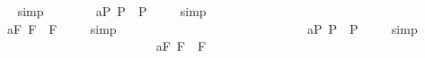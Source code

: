 \begin{isabellebody}
\isadelimproof
\ %
\endisadelimproof
%
\isatagproof
{}\isamarkupfalse%
\ simp\ \isamarkupfalse%
%
\endisatagproof
{\isafoldproof}%
%
\isadelimproof
%
\endisadelimproof
\ \ \ \ \ \isanewline
{}\isamarkupfalse%
\ a{}{}{\isacharunderscore}{}{\isacharunderscore}P{\isacharcolon}\ {\isachardoublequoteopen}{\isacharbrackleft}\isactrlbold {\isasymbox}{\isacharparenleft}{\isasymphi}\isactrlsup P{\isacharparenright}\ \isactrlbold {\isasymrightarrow}\ {\isacharparenleft}{\isasymphi}\isactrlsup P{\isacharparenright}{\isacharbrackright}\ {\isacharequal}\ {\isasymtop}{\isachardoublequoteclose}%
\isadelimproof
\ %
\endisadelimproof
%
\isatagproof
{}\isamarkupfalse%
\ simp\ \isamarkupfalse%
%
\endisatagproof
{\isafoldproof}%
%
\isadelimproof
%
\endisadelimproof
\ \ \ \ \ \ \ \ \ \ \ \ \ \ \ \ \ \ \ \ \ \ \ \ \ \ \ \isanewline
{}\isamarkupfalse%
\ a{}{}{\isacharunderscore}{}{\isacharunderscore}F{\isacharcolon}\ {\isachardoublequoteopen}{\isacharbrackleft}\isactrlbold {\isasymbox}{\isacharparenleft}{\isasymphi}\isactrlsup F{\isacharparenright}\ \isactrlbold {\isasymrightarrow}\ {\isacharparenleft}{\isasymphi}\isactrlsup F{\isacharparenright}{\isacharbrackright}\ {\isacharequal}\ {\isasymtop}{\isachardoublequoteclose}%
\isadelimproof
\ %
\endisadelimproof
%
\isatagproof
{}\isamarkupfalse%
\ simp\ \isamarkupfalse%
%
\endisatagproof
{\isafoldproof}%
%
\isadelimproof
%
\endisadelimproof
\ \ \ \ \ \ \ \ \ \ \ \ \ \ \ \ \ \ \ \ \ \ \ \ \ \ \ \isanewline
\isanewline
{}\isamarkupfalse%
\ a{}{}{\isacharunderscore}{}{\isacharunderscore}P{\isacharcolon}\ {\isachardoublequoteopen}{\isacharbrackleft}\isactrlbold {\isasymbox}{\isacharparenleft}\isactrlbold {\isasymdiamond}{\isacharparenleft}{\isasymphi}\isactrlsup P{\isacharparenright}{\isacharparenright}\ \isactrlbold {\isasymrightarrow}\ \isactrlbold {\isasymdiamond}{\isacharparenleft}{\isasymphi}\isactrlsup P{\isacharparenright}{\isacharbrackright}\ {\isacharequal}\ {\isasymtop}{\isachardoublequoteclose}%
\isadelimproof
\ %
\endisadelimproof
%
\isatagproof
{}\isamarkupfalse%
\ simp\ \isamarkupfalse%
%
\endisatagproof
{\isafoldproof}%
%
\isadelimproof
%
\endisadelimproof
\ \ \ \ \ \ \ \ \ \ \ \ \ \ \ \ \ \ \ \ \ \ \ \isanewline
{}\isamarkupfalse%
\ a{}{}{\isacharunderscore}{}{\isacharunderscore}F{\isacharcolon}\ {\isachardoublequoteopen}{\isacharbrackleft}\isactrlbold {\isasymbox}{\isacharparenleft}\isactrlbold {\isasymdiamond}{\isacharparenleft}{\isasymphi}\isactrlsup F{\isacharparenright}{\isacharparenright}\ \isactrlbold {\isasymrightarrow}\ \isactrlbold {\isasymdiamond}{\isacharparenleft}{\isasymphi}\isactrlsup F{\isacharparenright}{\isacharbrackright}\ {\isacharequal}\ {\isasymtop}{\isachardoublequoteclose}%

\end{isabellebody}

